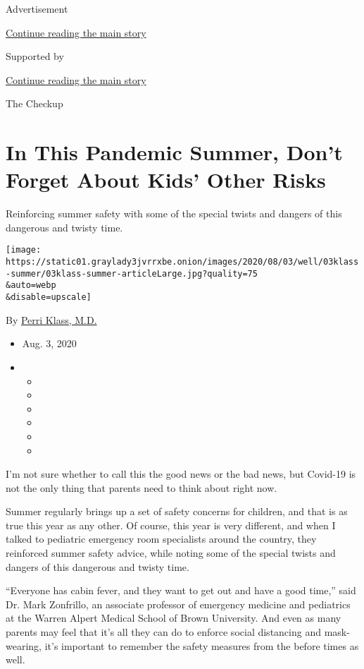 Advertisement

\protect\hyperlink{after-top}{Continue reading the main story}

Supported by

\protect\hyperlink{after-sponsor}{Continue reading the main story}

The Checkup

\hypertarget{in-this-pandemic-summer-dont-forget-about-kids-other-risks}{%
\section{In This Pandemic Summer, Don't Forget About Kids' Other
Risks}\label{in-this-pandemic-summer-dont-forget-about-kids-other-risks}}

Reinforcing summer safety with some of the special twists and dangers of
this dangerous and twisty time.

\texttt{[image: https://static01.graylady3jvrrxbe.onion/images/2020/08/03/well/03klass-summer/03klass-summer-articleLarge.jpg?quality=75\\\&auto=webp\\\&disable=upscale]}

By \href{https://www.nytimes3xbfgragh.onion/by/perri-klass-md}{Perri
Klass, M.D.}

\begin{itemize}
\item
  Aug. 3, 2020
\item
  \begin{itemize}
  \item
  \item
  \item
  \item
  \item
  \item
  \end{itemize}
\end{itemize}

I'm not sure whether to call this the good news or the bad news, but
Covid-19 is not the only thing that parents need to think about right
now.

Summer regularly brings up a set of safety concerns for children, and
that is as true this year as any other. Of course, this year is very
different, and when I talked to pediatric emergency room specialists
around the country, they reinforced summer safety advice, while noting
some of the special twists and dangers of this dangerous and twisty
time.

``Everyone has cabin fever, and they want to get out and have a good
time,'' said Dr. Mark Zonfrillo, an associate professor of emergency
medicine and pediatrics at the Warren Alpert Medical School of Brown
University. And even as many parents may feel that it's all they can do
to enforce social distancing and mask-wearing, it's important to
remember the safety measures from the before times as well.

